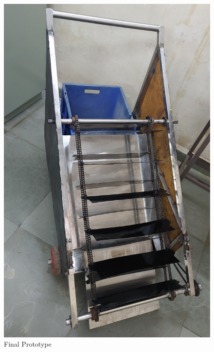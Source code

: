 \begin{figure}[H]
    \centering
    \includegraphics[scale=0.1]{with bucket 1.jpg}
    \caption{Final Prototype}
    \label{fig:final prototype 0}
\end{figure}


\pagebreak

